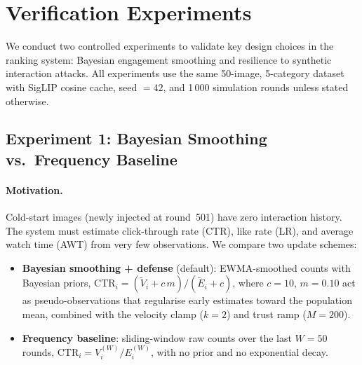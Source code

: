 %

\section{Verification Experiments}

We conduct two controlled experiments to validate key design choices
in the ranking system: Bayesian engagement smoothing and resilience to
synthetic interaction attacks.  All experiments use the same 50-image,
5-category dataset with SigLIP cosine cache, seed $= 42$, and
1\,000 simulation rounds unless stated otherwise.

\subsection{Experiment 1: Bayesian Smoothing vs.\ Frequency Baseline}
\label{sec:exp-bayesian}

\paragraph{Motivation.}
Cold-start images (newly injected at round~501) have zero interaction
history.  The system must estimate click-through rate (CTR), like rate
(LR), and average watch time (AWT) from very few observations.  We
compare two update schemes:

\begin{itemize}
  \item \textbf{Bayesian smoothing + defense} (default): EWMA-smoothed
        counts with Bayesian priors,
        $\mathrm{CTR}_i = (\tilde V_i + c\,m) / (\tilde E_i + c)$,
        where $c{=}10$, $m{=}0.10$ act as pseudo-observations that
        regularise early estimates toward the population mean, combined
        with the velocity clamp ($k{=}2$) and trust ramp ($M{=}200$).
  \item \textbf{Frequency baseline}: sliding-window raw counts over
        the last $W{=}50$ rounds,
        $\mathrm{CTR}_i = V_i^{(W)} / E_i^{(W)}$,
        with no prior and no exponential decay.
\end{itemize}

